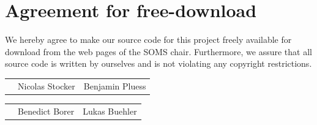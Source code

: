 \documentclass[11pt]{article}
\begin{document}

\newpage


\newpage
\section*{Agreement for free-download}
\bigskip


\bigskip


\large We hereby agree to make our source code for this project freely available for download from the web pages of the SOMS chair. Furthermore, we assure that all source code is written by ourselves and is not violating any copyright restrictions.

\begin{center}

\bigskip


\bigskip


\begin{tabular}{@{}p{3.3cm}@{}p{6cm}@{}@{}p{6cm}@{}}
\begin{minipage}{3cm}

\end{minipage}
&
\begin{minipage}{6cm}
\vspace{2mm} \large Nicolas Stocker 


 \vspace{\baselineskip}

\end{minipage}
&
\begin{minipage}{6cm}

\large Benjamin Pluess

\end{minipage}
\end{tabular}

\bigskip
\bigskip
\bigskip

\begin{tabular}{@{}p{3.3cm}@{}p{6cm}@{}@{}p{6cm}@{}}
\begin{minipage}{3cm}

\end{minipage}
&
\begin{minipage}{6cm}
\vspace{2mm} \large Benedict Borer 


 \vspace{\baselineskip}

\end{minipage}
&
\begin{minipage}{6cm}

\large Lukas Buehler

\end{minipage}
\end{tabular}


\end{center}
\end{document}
